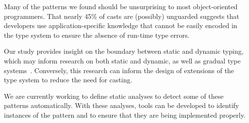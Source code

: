 Many of the patterns we found should be unsurprising to most object-oriented programmers.
That nearly 45\% of casts are (possibly) unguarded 
suggests that developers use application-specific knowledge that cannot be easily encoded in
the type system to ensure the absence of run-time type errors.

Our study provides insight on the boundary between static and dynamic typing,
which may inform research on both static and dynamic,
as well as gradual type systems~\citep{Siek06gradualtyping}.
Conversely, this research can inform the design of extensions of the \java{} type system to reduce the need for casting.

We are currently working to define static analyses to detect some of these patterns automatically.
With these analyses,
tools can be developed to identify instances of the pattern and to ensure that they are being implemented properly.
